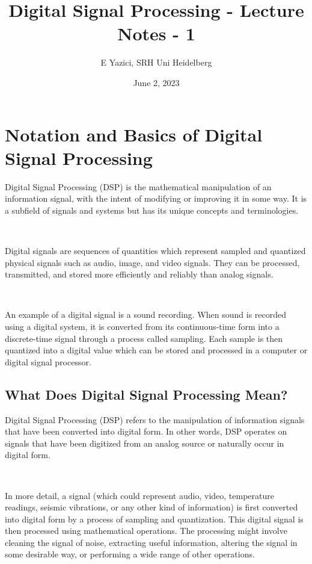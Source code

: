 \documentclass[11pt]{article}
\title{Digital Signal Processing - Lecture Notes - 1}
\author{E Yazici, SRH Uni Heidelberg}
\date{June 2, 2023}
\begin{document}
\maketitle

\section*{Notation and Basics of Digital Signal Processing}

Digital Signal Processing (DSP) is the mathematical manipulation of an information signal, with the intent of modifying or improving it in some way. It is a subfield of signals and systems but has its unique concepts and terminologies.

\ 

Digital signals are sequences of quantities which represent sampled and quantized physical signals such as audio, image, and video signals. They can be processed, transmitted, and stored more efficiently and reliably than analog signals.

\ 


An example of a digital signal is a sound recording. When sound is recorded using a digital system, it is converted from its continuous-time form into a discrete-time signal through a process called sampling. Each sample is then quantized into a digital value which can be stored and processed in a computer or digital signal processor.

\subsection*{What Does Digital Signal Processing Mean?}

Digital Signal Processing (DSP) refers to the manipulation of information signals that have been converted into digital form. In other words, DSP operates on signals that have been digitized from an analog source or naturally occur in digital form.

\ 

In more detail, a signal (which could represent audio, video, temperature readings, seismic vibrations, or any other kind of information) is first converted into digital form by a process of sampling and quantization. This digital signal is then processed using mathematical operations. The processing might involve cleaning the signal of noise, extracting useful information, altering the signal in some desirable way, or performing a wide range of other operations.

\ 
\end{document}
